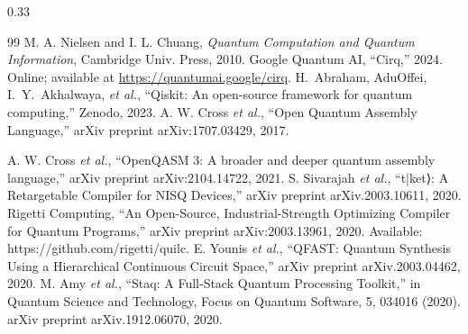\documentclass[final]{beamer}
\let\oldblock\block
\let\endoldblock\endblock
\renewenvironment{block}[1]{
    \vspace{2em} %
    \oldblock{#1}
    }{
    \endoldblock   %
}
\begin{document}
\begin{frame}[t]
\begin{columns}[t]
\begin{column}{0.33\textwidth}
                \begin{block}{References}
                    \begin{thebibliography}{99}
                        M. A. Nielsen and I. L. Chuang, \textit{Quantum Computation and Quantum Information}, Cambridge Univ. Press, 2010.
                         Google Quantum AI, ``Cirq,'' 2024. Online; available at \url{https://quantumai.google/cirq}.
                         H.~Abraham, AduOffei, I.~Y.~Akhalwaya, \emph{et al.}, ``Qiskit: An open-source framework for quantum computing,'' Zenodo, 2023.
                         A. W. Cross \textit{et al.}, ``Open Quantum Assembly Language,'' arXiv preprint arXiv:1707.03429, 2017.

                         A. W. Cross \textit{et al.}, ``OpenQASM 3: A broader and deeper quantum assembly language,'' arXiv preprint arXiv:2104.14722, 2021.
                         S. Sivarajah \textit{et al.}, ``t|ket⟩: A Retargetable Compiler for NISQ Devices,'' arXiv preprint arXiv.2003.10611, 2020.
                         Rigetti Computing, ``An Open-Source, Industrial-Strength Optimizing Compiler for Quantum Programs,'' arXiv preprint arXiv:2003.13961, 2020.
                        Available: https://github.com/rigetti/quilc.
                         E. Younis \textit{et al.}, ``QFAST: Quantum Synthesis Using a Hierarchical Continuous Circuit Space,'' arXiv preprint arXiv.2003.04462, 2020.
                         M. Amy \textit{et al.}, ``Staq: A Full-Stack Quantum Processing Toolkit,'' in Quantum Science and Technology, Focus on Quantum Software, 5, 034016 (2020).
                        arXiv preprint arXiv.1912.06070, 2020.
                    \end{thebibliography}
                \end{block}
            \end{column}

        \end{columns}

    \end{frame}
\end{document}
